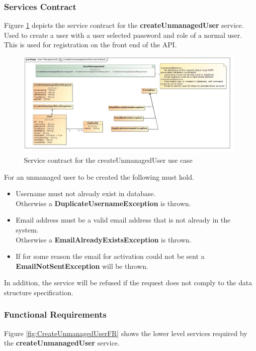 \subsubsection{Services Contract}
Figure \ref{fig:CreateUnmanagedUserServicesContract} depicts the service contract
for the \textbf{createUnmanagedUser} service.
Used to create a user with a user selected password and role of a normal user. 
This is used for registration on the front end of the API.

\begin{figure}[H]
  \begin{center}
  \includegraphics[scale=0.4]{../Diagrams and Charts/Users/CreateUnmanagedUserServiceContract.jpg}
  \caption{Service contract for the createUnmanagedUser use case}
  \label{fig:CreateUnmanagedUserServicesContract}
  \end{center}  
\end{figure}

For an unmanaged user to be created the following must hold.
\begin{itemize}
	\item Username must not already exist in database.\\
	Otherwise a \textbf{DuplicateUsernameException} is thrown.
	\item Email address must be a valid email address that is not already in the system.\\
	Otherwise a \textbf{EmailAlreadyExistsException} is thrown.
	\item If for some reason the email for activation could not be sent
	a \textbf{EmailNotSentException} will be thrown.
\end{itemize}

In addition, the service will be refused if the request does not comply to the data structure specification.

\subsubsection{Functional Requirements}
Figure \ref{fig:CreateUnmanagedUserFR} shows the lower level services required
by the \textbf{createUnmanagedUser} service.

